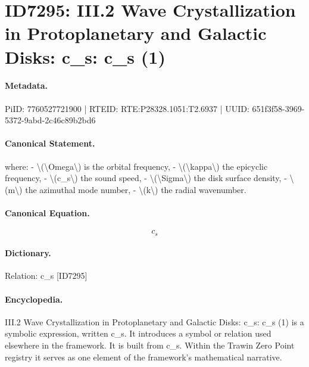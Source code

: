 \section*{ID7295: III.2 Wave Crystallization in Protoplanetary and Galactic Disks: c\_s: c\_s (1)}
\paragraph{Metadata.}
PiID: 7760527721900 | RTEID: RTE:P28328.1051:T2.6937 | UUID: 651f3f58-3969-5372-9abd-2c46c89b2bd6

\paragraph{Canonical Statement.}
where: - \textbackslash{}(\textbackslash{}Omega\textbackslash{}) is the orbital frequency, - \textbackslash{}(\textbackslash{}kappa\textbackslash{}) the epicyclic frequency, - \textbackslash{}(c\_s\textbackslash{}) the sound speed, - \textbackslash{}(\textbackslash{}Sigma\textbackslash{}) the disk surface density, - \textbackslash{}(m\textbackslash{}) the azimuthal mode number, - \textbackslash{}(k\textbackslash{}) the radial wavenumber.

\paragraph{Canonical Equation.}
\[
c_s
\]

\paragraph{Dictionary.}
Relation: c\_s [ID7295]

\paragraph{Encyclopedia.}
III.2 Wave Crystallization in Protoplanetary and Galactic Disks: c\_s: c\_s (1) is a symbolic expression, written c\_s. It introduces a symbol or relation used elsewhere in the framework. It is built from c\_s. Within the Trawin Zero Point registry it serves as one element of the framework's mathematical narrative.
